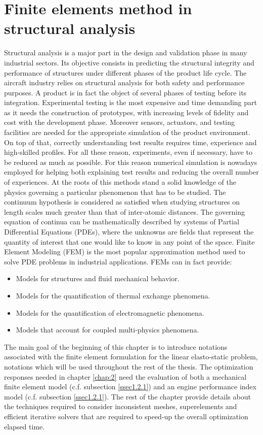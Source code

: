 \section{Finite elements method in structural analysis }
\label{sec:1.1}
Structural analysis is a major part in the design and validation phase in many industrial sectors. Its objective consists in predicting the structural integrity and performance of structures under different phases of the product life cycle.
The aircraft industry relies on structural analysis for both safety and performance purposes. A product is in fact the object of several phases of testing before its integration.
Experimental testing is the most expensive and time demanding part as it needs the construction of prototypes, with increasing levels of fidelity and cost with the development phase. Moreover sensors, actuators, and testing facilities are needed for the appropriate simulation of the product environment.
On top of that, correctly understanding test results requires time, experience and high-skilled profiles. 
For all these reason, experiments, even if necessary, have to be reduced as much as possible. For this reason numerical simulation is nowadays employed for helping both explaining test results and reducing the overall number of experiences. 
At the roots of this methods stand a solid knowledge of the physics governing a particular phenomenon that has to be studied. 
The continuum hypothesis is considered as satisfied when studying structures on length scales much greater than that of inter-atomic distances. 
The governing equation of continua can be mathematically described by systems of Partial Differential Equations (PDEs), where the unknowns are fields that represent the quantity of interest that one would like to know in any point of the space. 
Finite Element Modeling (FEM) is the most popular approximation method used to solve PDE problems in industrial applications.
FEMs can in fact provide:
\begin{itemize}
\item Models for structures and fluid mechanical behavior.
\item Models for the quantification of thermal exchange phenomena.
\item Models for the quantification of electromagnetic phenomena. 
\item Models that account for coupled multi-physics phenomena.
\end{itemize}
The main goal of the beginning of this chapter is to introduce notations associated with the finite element formulation for the linear elasto-static problem, notations which will be used throughout the rest of the thesis. The optimization responses needed in chapter \ref{chap:2} need the evaluation of both a mechanical finite element model (c.f. subsection \ref{ssec1.2.1}) and an engine performance index model (c.f. subsection \ref{ssec1.2.1}). The rest of the chapter provide details about the techniques required to consider inconsistent meshes, superelements and efficient iterative solvers that are required to speed-up the overall optimization elapsed time.

